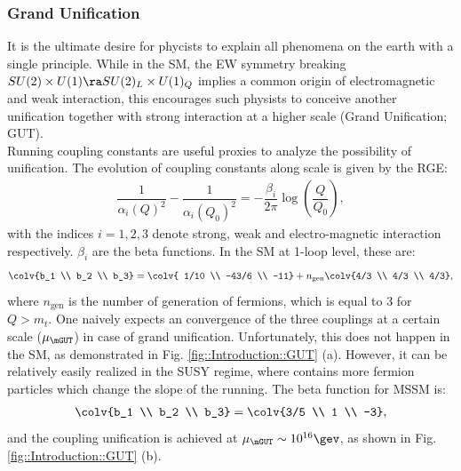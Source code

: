 \subsubsection{Grand Unification}
It is the ultimate desire for phycists to explain all phenomena on the earth with a single principle. 
While in the SM, the EW symmetry breaking $SU(2) \times U(1) \ra SU(2)_L \times U(1)_Q$ implies a common origin of electromagnetic and weak interaction, this encourages such physists to conceive another unification together with strong interaction at a higher scale (Grand Unification; GUT). \\

Running coupling constants are useful proxies to analyze the possibility of unification.
The evolution of coupling constants along scale is given by the RGE:
\begin{align}
\dfrac{1}{\alpha_i(Q)^2}-\dfrac{1}{\alpha_i(Q_0)^2} = -\dfrac{\beta_i}{2\pi} \log{\left(\dfrac{Q}{Q_0}\right)},
\end{align}
with the indices $i=1,2,3$ denote strong, weak and electro-magnetic interaction respectively.
$\beta_i$ are the beta functions. In the SM at 1-loop level, these are:
\begin{align}
\colv{b_1 \\ b_2 \\ b_3} = \colv{ 1/10 \\ -43/6 \\ -11} + n_{\mathrm{gen}} \colv{4/3 \\ 4/3 \\ 4/3},
\end{align}
where $n_{\mathrm{gen}}$ is the number of generation of fermions, which is equal to $3$ for $Q>m_t$.
One naively expects an convergence of the three couplings at a certain scale ($\mu_{\mGUT}$) in case of grand unification.
Unfortunately, this does not happen in the SM, as demonstrated in Fig. \ref{fig::Introduction::GUT} (a).
However, it can be relatively easily realized in the SUSY regime, where contains more fermion particles which change the slope of the running. The beta function for MSSM is:
\begin{align}
\colv{b_1 \\ b_2 \\ b_3} = \colv{3/5 \\ 1 \\ -3},
\end{align}
and the coupling unification is achieved at $\mu_{\mGUT} \sim 10^{16}\gev$, as shown in Fig. \ref{fig::Introduction::GUT} (b).


